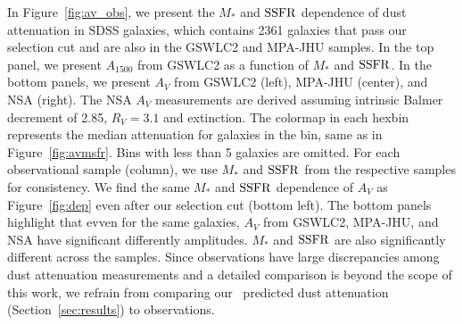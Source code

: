 In Figure~\ref{fig:av_obs}, we present the $M_*$ and ${\rm SSFR}$ dependence of dust
attenuation in SDSS galaxies, which contains 2361 galaxies that pass our
selection cut and are also in the GSWLC2 and MPA-JHU samples.
In the top panel, we present $A_{1500}$ from GSWLC2 as a function of $M_*$ and
${\rm SSFR}$.
In the bottom panels, we present $A_V$ from GSWLC2 (left), MPA-JHU (center),
and NSA (right).
The NSA $A_V$ measurements are derived assuming intrinsic Balmer decrement of
2.85, $R_V=3.1$ and \cite{odonnell1994} extinction. 
The colormap in each hexbin represents the median attenuation for galaxies in
the bin, same  as in Figure~\ref{fig:avmsfr}. 
Bins with less than 5 galaxies are omitted. 
For each observational sample (column), we use $M_*$ and ${\rm SSFR}$ from the
respective samples for consistency.
We find the same $M_*$ and ${\rm SSFR}$ dependence of $A_V$ as Figure~\ref{fig:dep}
even after our selection cut (bottom left). 
The bottom panels highlight that evven for the same galaxies, $A_V$ from
GSWLC2, MPA-JHU, and NSA have significant differently amplitudes. 
$M_*$ and ${\rm SSFR}$ are also significantly different across the samples.
Since observations have large discrepancies among dust attenuation measurements
and a detailed comparison is beyond the scope of this work, we refrain from
comparing our \eda~predicted dust attenuation (Section~\ref{sec:results}) to
observations.
